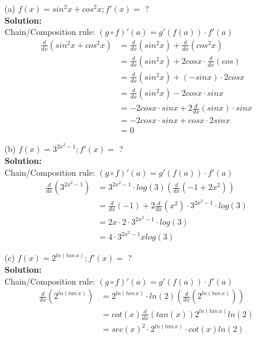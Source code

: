 \documentclass[a4paper]{article}
\begin{document}
\begin{enumerate}
	\begin{enumerate}
		\item[(a)] $f(x) = sin^2 x + cos^2 x; f'(x) = $ ?\\
		\textbf{Solution:}\\
		
Chain/Composition rule: $(g \circ f)'(a) = g'(f(a)) \cdot f'(a)$\\			
		
\begin{align*}
\frac{d}{dx}(sin^2 x + cos^2 x) &= \frac{d}{dx}(sin^2 x) + \frac{d}{dx}(cos^2 x)\\
&= \frac{d}{dx}(sin^2 x) + 2 cos x \cdot \frac{d}{dx}(cos)\\
&= \frac{d}{dx}(sin^2 x) + (-sin x) \cdot 2 cos x\\
&= \frac{d}{dx}(sin^2 x) - 2 cos x \cdot sin x\\
&= - 2 cos x \cdot sin x + 2 \frac{d}{dx}(sin x) \cdot sin x\\
&= -2 cos x \cdot sin x + cos x \cdot 2 sin x\\
&= 0
\end{align*}			
		
		
		
		\item[(b)] $f(x) = 3^{2x^2 - 1}; f'(x) = $ ?\\
		\textbf{Solution:}\\

Chain/Composition rule: $(g \circ f)'(a) = g'(f(a)) \cdot f'(a)$\\	

\begin{align*}
\frac{d}{dx}(3^{2x^2 - 1}) &= 3^{2x^2 - 1} \cdot log(3)(\frac{d}{dx}(-1 + 2x^2))\\
&= \frac{d}{dx}(-1) + 2 \frac{d}{dx}(x^2) \cdot 3^{2x^2 - 1} \cdot log(3)\\
&= 2x \cdot 2 \cdot 3^{2x^2 - 1} \cdot log(3)\\
&= 4 \cdot 3^{2x^2 - 1} x log(3)
\end{align*}		
		
		
		
		\item[(c)] $f(x) = 2^{ln(tan \, x)}; f'(x) = $ ?\\
		\textbf{Solution:}\\
		
Chain/Composition rule: $(g \circ f)'(a) = g'(f(a)) \cdot f'(a)$\\


\begin{align*}
\frac{d}{dx}(2^{ln(tan \, x)}) &= 2^{ln(tan \, x)} \cdot ln(2)( \frac{d}{dx}(2^{ln(tan \, x)}))\\
&= cot(x) \frac{d}{dx}(tan(x)) 2^{ln(tan \, x)} ln(2)\\
&= sec(x)^2 \cdot 2^{ln(tan \, x)} \cdot cot(x) ln(2)
\end{align*}		
		

\end{enumerate}
\end{enumerate}
\end{document}
